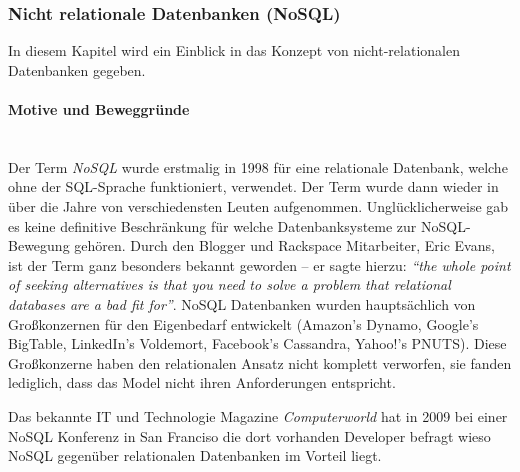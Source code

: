 \subsubsection{Nicht relationale Datenbanken (NoSQL)}
\label{subsec:nichtrelationaleDB}

In diesem Kapitel wird ein Einblick in das Konzept von nicht-relationalen Datenbanken gegeben. 

\paragraph{Motive und Beweggründe}\mbox{}\\
Der Term \textit{NoSQL} wurde erstmalig in 1998 für eine relationale Datenbank, welche ohne der SQL-Sprache funktioniert, verwendet\cite{MELD.CH2-noSQL.firstSQLNaming}. Der Term wurde dann wieder in über die Jahre von verschiedensten Leuten aufgenommen. Unglücklicherweise gab es keine definitive Beschränkung für welche Datenbanksysteme zur NoSQL-Bewegung gehören. Durch den Blogger und Rackspace Mitarbeiter, Eric Evans, ist der Term ganz besonders bekannt geworden – er sagte hierzu: \textit{“the whole point of seeking alternatives is that you need to solve a problem that relational databases are a bad fit for”}\cite{MELD.CH2-noSQL.whatsInAName}. NoSQL Datenbanken wurden hauptsächlich von Großkonzernen für den Eigenbedarf entwickelt (Amazon’s Dynamo, Google’s BigTable, LinkedIn’s Voldemort, Facebook’s Cassandra, Yahoo!’s PNUTS). Diese Großkonzerne haben den relationalen Ansatz nicht komplett verworfen, sie fanden lediglich, dass das Model nicht ihren Anforderungen entspricht\cite{MELD.CH2-noSQL.capTheoremComp}.

Das bekannte IT und Technologie Magazine \textit{Computerworld} hat in 2009 bei einer NoSQL Konferenz in San Franciso die dort vorhanden Developer befragt wieso NoSQL gegenüber relationalen Datenbanken im Vorteil liegt\cite{MELD.CH2-noSQL.whyItsBetter}.

